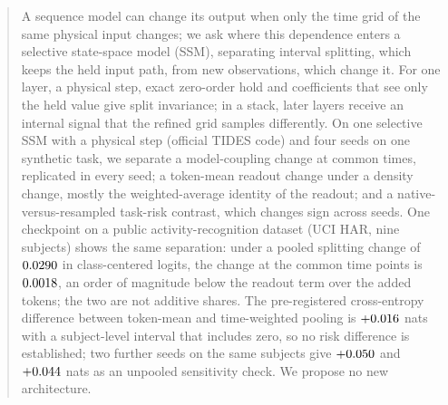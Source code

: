 \documentclass{article}
\theoremstyle{plain}
\theoremstyle{definition}
\theoremstyle{remark}
\begin{document}

\printAffiliationsAndNotice{}

\begin{abstract}
A sequence model can change its output when only the time grid of the same physical input changes; we ask where this dependence enters a selective state-space model (SSM), separating interval splitting, which keeps the held input path, from new observations, which change it.
For one layer, a physical step, exact zero-order hold and coefficients that see only the held value give split invariance; in a stack, later layers receive an internal signal that the refined grid samples differently.
On one selective SSM with a physical step (official TIDES code) and four seeds on one synthetic task, we separate a model-coupling change at common times, replicated in every seed; a token-mean readout change under a density change, mostly the weighted-average identity of the readout; and a native-versus-resampled task-risk contrast, which changes sign across seeds.
One checkpoint on a public activity-recognition dataset (UCI HAR, nine subjects) shows the same separation: under a pooled splitting change of $\HarCtRelAll$ in class-centered logits, the change at the common time points is $\HarCtRelEnd$, an order of magnitude below the readout term over the added tokens; the two are not additive shares.
The pre-registered cross-entropy difference between token-mean and time-weighted pooling is $\HarD$ nats with a subject-level interval that includes zero, so no risk difference is established; two further seeds on the same subjects give $\RviiiDA$ and $\RviiiDB$ nats as an unpooled sensitivity check. We propose no new architecture.
\end{abstract}

\end{document}
